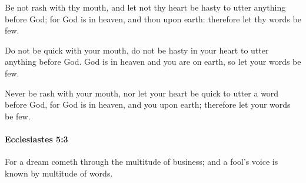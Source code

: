 			\begin{versebox}
					\item[BHS] 
					\item[LXX] 
					\item[ASV] Be not rash with thy mouth, and let not thy heart be hasty to utter anything before God; for God is in heaven, and thou upon earth: therefore let thy words be few.
					\item[NIV] Do not be quick with your mouth, do not be hasty in your heart to utter anything before God. God is in heaven and you are on earth, so let your words be few.
					\item[NRSV] Never be rash with your mouth, nor let your heart be quick to utter a word before God, for God is in heaven, and you upon earth; therefore let your words be few.
			\end{versebox}

		\paragraph{Ecclesiastes 5:3} %
			\label{ECCLESIASTES-5-3}

			For a dream cometh through the multitude of business; and a fool’s voice is known by multitude of words.

